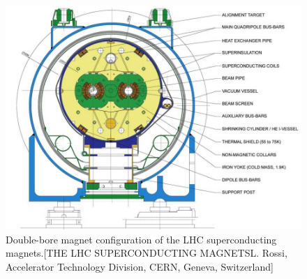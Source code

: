 \documentclass[letterpaper,12pt]{article}
\begin{document}
\begin{figure}[]
    \begin{centering}	
    \includegraphics[width=.4\textwidth]{Detector_plots/LHC-double-bore-magnet.jpg}
    \caption{ Double-bore magnet configuration of the LHC superconducting magnets.[THE LHC SUPERCONDUCTING MAGNETSL. Rossi, Accelerator Technology Division, CERN, Geneva, Switzerland]
        }
    \label{fig:double-bore-magnet}
    \end{centering}
\end{figure}
\end{document}

